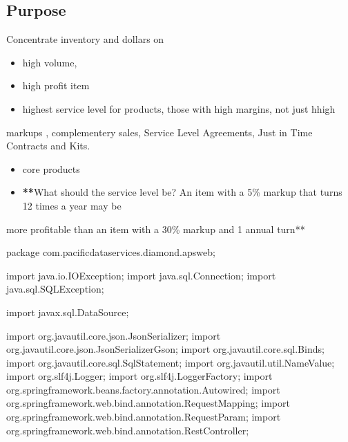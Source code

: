 \documentclass[letterpaper,10pt,english]{sphinxmanual}
\begin{document}
\subsection{Purpose}
\label{\detokenize{100-ABC:id1}}
Concentrate inventory and dollars on
\begin{itemize}
\item {} 
high volume,

\item {} 
high profit item

\item {} 
highest service level for  products, those with high margins, not just hhigh

\end{itemize}

markups , complementery sales, Service Level Agreements, Just in Time Contracts and Kits.
\begin{itemize}
\item {} 
core products

\item {} 
{\color{red}\bfseries{}**}What should the service level be?  An item with a 5\% markup that turns 12 times a year may be

\end{itemize}

more profitable than an item with a 30\% markup and 1 annual turn**
\begin{quote}

\end{quote}

package com.pacificdataservices.diamond.apsweb;

import java.io.IOException; import java.sql.Connection; import
java.sql.SQLException;

import javax.sql.DataSource;

import org.javautil.core.json.JsonSerializer; import
org.javautil.core.json.JsonSerializerGson; import
org.javautil.core.sql.Binds; import org.javautil.core.sql.SqlStatement;
import org.javautil.util.NameValue; import org.slf4j.Logger; import
org.slf4j.LoggerFactory; import
org.springframework.beans.factory.annotation.Autowired; import
org.springframework.web.bind.annotation.RequestMapping; import
org.springframework.web.bind.annotation.RequestParam; import
org.springframework.web.bind.annotation.RestController;
\end{document}
